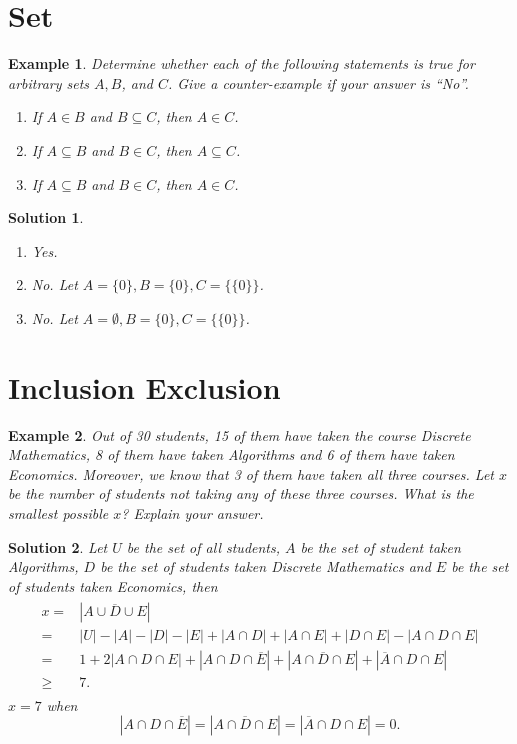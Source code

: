 \documentclass{../../cls/sig-alternate-05-2015}
\newtheorem{example}{Example}
\newtheorem*{solution*}{Solution}
\begin{document}
\section{Set}
\begin{example}
	Determine  whether each of the following statements is true for arbitrary sets $A, B$, and $C$. Give a counter-example if your answer is ``No''.\begin{enumerate}
		\item If $A \in B$ and $B \subseteq C$, then $A \in C$.
		\item If $A \subseteq B$ and $B \in C$, then $A \subseteq C$.
		\item If $A \subseteq B$ and $B \in C$, then $A \in C$.
	\end{enumerate}
\end{example}
\begin{solution*}
	\begin{enumerate}
		\item Yes.
		\item No. Let $A = \{0\}, B = \{0\}, C = \{\{0\}\}$.
		\item No. Let $A = \emptyset, B = \{0\}, C = \{\{0\}\}$.
	\end{enumerate}
\end{solution*}

\section{Inclusion Exclusion}
\begin{example}
	Out of 30 students, 15 of them have taken the course Discrete Mathematics, 8 of them have taken Algorithms and 6 of them have taken Economics. Moreover, we know that 3 of them have taken all three courses. Let $x$ be the number of students not taking any of these three courses. What is the smallest possible $x$? Explain your answer.
\end{example}
\begin{solution*}
	Let $U$ be the set of all students, $A$ be the set of student taken Algorithms, $D$ be the set of students taken Discrete Mathematics and $E$ be the set of students taken Economics, then \begin{align}
		\begin{aligned}
		x = & \left|\overline{A \cup D \cup E}\right|\\
		= & \left|U\right| - \left|A\right| - \left|D\right| - \left|E\right| + \left|A \cap D\right| + \left|A \cap E\right| + \left|D \cap E\right| - \left|A \cap D \cap E\right|\\
		= & 1 + 2 \left|A \cap D \cap E\right| + \left|A \cap D \cap \overline{E}\right| + \left|A \cap \overline{D} \cap E\right| + \left|\overline{A} \cap D \cap E\right|\\
		\ge & 7.
		\end{aligned}
	\end{align} $x = 7$ when \begin{equation}
		\left|A \cap D \cap \overline{E}\right| = \left|A \cap \overline{D} \cap E\right| = \left|\overline{A} \cap D \cap E\right| = 0.
	\end{equation}
\end{solution*}
\end{document}
